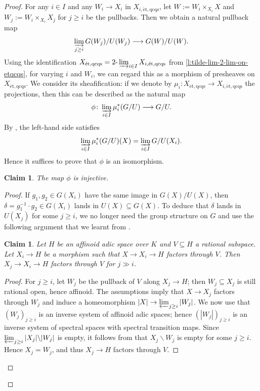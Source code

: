 \documentclass[10pt,a4paper]{article}
\newtheorem{Claim}[thm]{Claim}
\theoremstyle{definition}
\theoremstyle{remark}
\newcommand{\lra}{\longrightarrow}
\newcommand{\etqcqs}{{\operatorname{\acute{e}t,qcqs}}}
\numberwithin{equation}{section}
\begin{document}
\begin{proof}
	For any $i\in I$ and any $W_i\to X_{i}$ in $X_{i,\etqcqs}$, let $W:=W_i\times_{X_i}X$ and $W_j:=W_i\times_{X_i}X_j$ for $j\geq i$ be the pullbacks. Then we obtain a natural pullback map
	\[\varinjlim_{j\geq i} G(W_j)/U(W_j)\lra G(W)/U(W). \]
	Using the identification
	$ X_{\etqcqs}=2\text{-}\varinjlim_{i\in I}X_{i,\etqcqs}$ from \cref{l:tilde-lim-2-lim-on-etqcqs},  for varying $i$ and $W_i$, we can regard this as a morphism of presheaves on $X_{\etqcqs}$. We consider its sheafification: if we denote by $\mu_i\colon X_{\etqcqs}\to X_{i,\etqcqs}$ the projections, then this can be described as the natural map
	\[\phi\colon \varinjlim_{i\in I}\mu_i^{\ast}(G/U)\lra G/U.\]
	By \cite[Tag~09YN]{StacksProject}, the left-hand side satisfies 
	\[ \varinjlim_{i\in I}\mu_i^{\ast}(G/U)(X)=\varinjlim_{i\in I} G/U(X_i).\]
	Hence it suffices to prove that $\phi$ is an isomorphism.
        
	\begin{Claim}
		The map $\phi$ is injective.
	\end{Claim}

        \begin{proof}
	If $g_1,g_2\in G(X_i)$ have the same image in $G(X)/U(X)$, then $\delta=g_1^{-1}\cdot g_2\in G(X_i)$ lands in $U(X)\subseteq G(X)$. To deduce that $\delta$ lands in $U(X_j)$ for some $j\geq i$, we no longer need the group structure on $G$ and use the following argument that we learnt from \cite[Lemma 6.13(iv)]{perfectoid-spaces}. 

        \begin{Claim}
		Let $H$ be an affinoid adic space over $K$ and $V\subseteq H$ a rational subspace. Let $X_i\to H$ be a morphism such that $X\to X_i\to H$ factors through $V$. Then $X_j\to X_i\to H$ factors through $V$ for $j\gg i$.
	\end{Claim}

        \begin{proof} For $j\geq i$, let $W_j$ be the pullback of $V$ along $X_j\to H$; then $W_j\subseteq X_j$ is still rational open, hence affinoid. The assumptions imply that $X\to X_j$ factors through $W_j$ and induce a homeomorphism $|X|\to \varprojlim_{j\geq i} |W_j|$. We now use that $(W_j)_{j\geq i}$ is an inverse system of affinoid adic spaces; hence $(|W_j|)_{j\geq i}$ is an inverse system of spectral spaces with spectral transition maps. Since $\varprojlim_{j\geq i} |X_j|\backslash |W_j|$ is empty, it follows from \cite[Tag 0A2W]{StacksProject} that $X_j\backslash W_j$ is empty for some $j\geq i$. Hence $X_j=W_j$, and thus $X_j\to H$ factors through $V$. 
	\end{proof}


\end{proof}
\end{proof}
\end{document}
